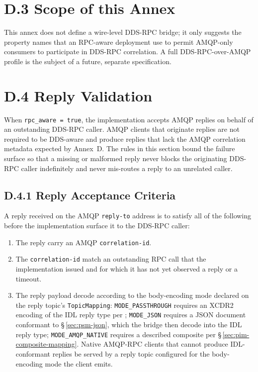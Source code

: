 \documentclass{../styles/zerodds-vendor-spec}
\begin{document}
\section*{D.3 Scope of this Annex}

This annex does not define a wire-level DDS-RPC bridge; it only
suggests the property names that an RPC-aware deployment
 use to permit AMQP-only consumers to participate
in DDS-RPC correlation. A full DDS-RPC-over-AMQP profile is the
subject of a future, separate specification.

\section*{D.4 Reply Validation}\label{sec:rpc-reply-validation}

When \texttt{rpc\_aware = true}, the implementation accepts AMQP
replies on behalf of an outstanding DDS-RPC caller. AMQP clients
that originate replies are not required to be DDS-aware and
 produce replies that lack the AMQP correlation
metadata expected by Annex~D. The rules in this section bound
the failure surface so that a missing or malformed reply never
blocks the originating DDS-RPC caller indefinitely and never
mis-routes a reply to an unrelated caller.

\subsection*{D.4.1 Reply Acceptance Criteria}

A reply received on the AMQP \texttt{reply-to} address is
 to satisfy all of the following before the
implementation  surface it to the DDS-RPC caller:

\begin{enumerate}
  \item The reply  carry an AMQP
        \texttt{correlation-id}.
  \item The \texttt{correlation-id}  match an
        outstanding RPC call that the implementation issued and
        for which it has not yet observed a reply or a timeout.
  \item The reply payload  decode according to the
        body-encoding mode declared on the reply topic's
        \texttt{TopicMapping}: \texttt{MODE\_PASSTHROUGH} requires
        an XCDR2 encoding of the IDL reply type per
        ; \texttt{MODE\_JSON} requires a
        JSON document conformant to \S\,\ref{sec:psm-json}, which
        the bridge  then decode into the IDL reply
        type; \texttt{MODE\_AMQP\_NATIVE} requires a described
        composite per \S\,\ref{sec:pim-composite-mapping}. Native
        AMQP-RPC clients that cannot produce IDL-conformant
        replies  be served by a reply topic
        configured for the body-encoding mode the client emits.
\end{enumerate}
\end{document}

